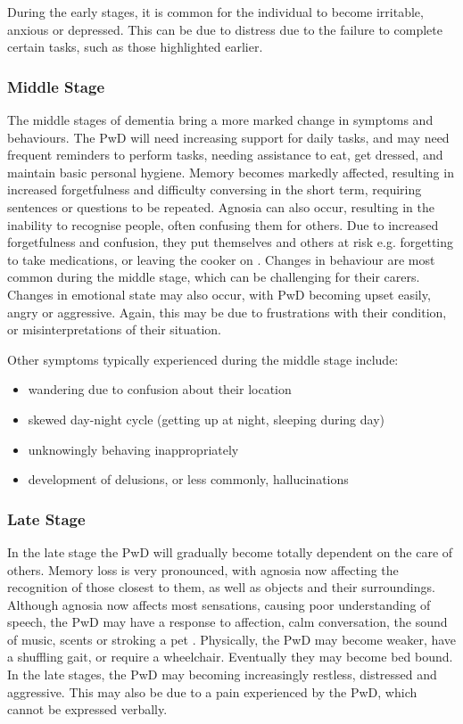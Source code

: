 During the early stages, it is common for the individual to become irritable, anxious or depressed. This can be due to distress due to the failure to complete certain tasks, such as those highlighted earlier.

\subsubsection{Middle Stage}
The middle stages of dementia bring a more marked change in symptoms and behaviours. The PwD will need increasing support for daily tasks, and may need frequent reminders to perform tasks, needing assistance to eat, get dressed, and maintain basic personal hygiene. Memory becomes markedly affected, resulting in increased forgetfulness and difficulty conversing in the short term, requiring sentences or questions to be repeated. Agnosia can also occur, resulting in the inability to recognise people, often confusing them for others. Due to increased forgetfulness and confusion, they put themselves and others at risk e.g. forgetting to take medications, or leaving the cooker on \cite{Grout2015}.
Changes in behaviour are most common during the middle stage, which can be challenging for their carers. Changes in emotional state may also occur, with PwD becoming upset easily, angry or aggressive. Again, this may be due to frustrations with their condition, or misinterpretations of their situation.

Other symptoms typically experienced during the middle stage include:
\begin{itemize}[noitemsep,topsep=0pt]
\item wandering due to confusion about their location
\item skewed day-night cycle (getting up at night, sleeping during day)
\item unknowingly behaving inappropriately
\item development of delusions, or less commonly, hallucinations
\end{itemize}


\subsubsection{Late Stage}
In the late stage the PwD will gradually become totally dependent on the care of others. Memory loss is very pronounced, with agnosia now affecting the recognition of those closest to them, as well as objects and their surroundings. Although agnosia now affects most sensations, causing poor understanding of speech, the PwD may have a response to affection, calm conversation, the sound of music, scents or stroking a pet \cite{Grout2015}.
Physically, the PwD may become weaker, have a shuffling gait, or require a wheelchair. Eventually they may become bed bound. In the late stages, the PwD may becoming increasingly restless, distressed and aggressive. This may also be due to a pain experienced by the PwD, which cannot be expressed verbally.

